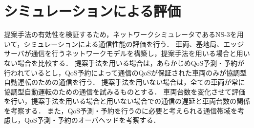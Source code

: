 \documentclass[a4paper,10pt,twocolumn,uplatex]{jsarticle}
\begin{document}
\section{シミュレーションによる評価}
\label{simulation}
提案手法の有効性を検証するため，ネットワークシミュレータであるNS-3\cite{ns3}を用いて，シミュレーションによる通信性能の評価を行う．
車両、基地局、エッジサーバが通信を行うネットワークモデルを構築し，提案手法を用いる場合と用いない場合を比較する．
提案手法を用いる場合は，あらかじめQoS予測・予約が行われているとし，QoS予約によって通信のQoSが保証された車両のみが協調型自動運転のための通信を行う．
提案手法を用いない場合は，全ての車両が常に協調型自動運転のための通信を試みるものとする．
車両台数を変化させて評価を行い，提案手法を用いる場合と用いない場合での通信の遅延と車両台数の関係を考察する．
また，QoS予測・予約を行うのに必要と考えられる通信帯域を考慮し，QoS予測・予約のオーバヘッドを考察する．


\end{document}
